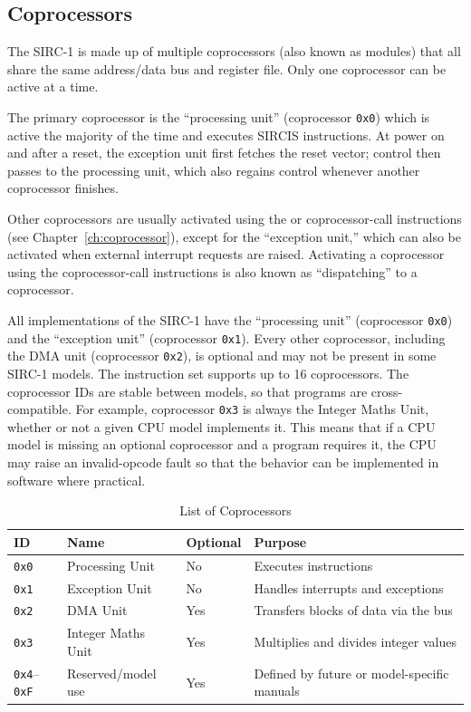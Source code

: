 \subsection{Coprocessors}

The SIRC-1 is made up of multiple coprocessors (also known as modules) that all share the same address/data bus and
register file. Only one coprocessor can be active at a time.

The primary coprocessor is the ``processing unit'' (coprocessor \texttt{0x0}) which is active the majority of the time
and executes SIRCIS instructions. At power on and after a reset, the exception unit first fetches the reset vector;
control then passes to the processing unit, which also regains control whenever another coprocessor finishes.

Other coprocessors are usually activated using the  or  coprocessor-call instructions
(see Chapter~\ref{ch:coprocessor}), except for the ``exception unit,'' which can also be activated when external
interrupt requests are raised. Activating a coprocessor using the coprocessor-call instructions is also known as
``dispatching'' to a coprocessor.

All implementations of the SIRC-1 have the ``processing unit'' (coprocessor \texttt{0x0}) and the ``exception unit''
(coprocessor \texttt{0x1}). Every other coprocessor, including the DMA unit (coprocessor \texttt{0x2}), is optional and
may not be present in some SIRC-1 models. The instruction set supports up to 16 coprocessors. The coprocessor IDs are
stable between models, so that programs are cross-compatible. For example, coprocessor \texttt{0x3} is always the
Integer Maths Unit, whether or not a given CPU model implements it. This means that if a CPU model is missing an
optional coprocessor and a program requires it, the CPU may raise an invalid-opcode fault so that the behavior can be
implemented in software where practical.

\begin{table}[H]
	\centering
	\begin{tabular}{llll}
		\toprule
		\textbf{ID}                & \textbf{Name}      & \textbf{Optional} & \textbf{Purpose}                            \\
		\midrule
		\texttt{0x0}               & Processing Unit    & No                & Executes instructions                       \\
		\texttt{0x1}               & Exception Unit     & No                & Handles interrupts and exceptions           \\
		\texttt{0x2}               & DMA Unit           & Yes               & Transfers blocks of data via the bus        \\
		\texttt{0x3}               & Integer Maths Unit & Yes               & Multiplies and divides integer values       \\
		\texttt{0x4}--\texttt{0xF} & Reserved/model use & Yes               & Defined by future or model-specific manuals \\
		\bottomrule
	\end{tabular}
	\caption{List of Coprocessors}
	\label{tab:coprocessor-list}
\end{table}


